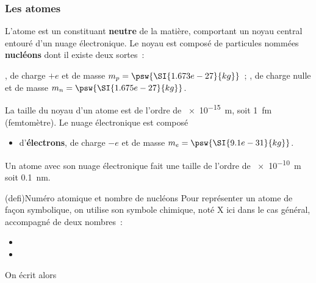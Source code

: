 \documentclass[../../main/main.tex]{subfiles}
\begin{document}
\subsubsection{Les atomes}
L'atome est un constituant \textbf{neutre} de la matière, comportant un
noyau central entouré d'un nuage électronique. Le noyau est composé de
particules nommées \textbf{nucléons} dont il existe deux sortes~:
\begin{itemize}
	, de charge $+e$ et de masse $m_p =
		\psw{\SI{1.673e-27}{kg}}$~;
	, de charge nulle et de masse $m_n =
		\psw{\SI{1.675e-27}{kg}}$.
\end{itemize}
La taille du noyau d'un atome est de l'ordre de \SI{e-15}{m}, soit
\SI{1}{fm} (femtomètre).
\smallbreak
Le nuage électronique est composé
\begin{itemize}
	\item d'\textbf{électrons}, de charge $-e$ et de masse $m_e =
		      \psw{\SI{9.1e-31}{kg}}$.
\end{itemize}
Un atome avec son nuage électronique fait une taille de l'ordre de
\SI{e-10}{m} soit \SI{0.1}{nm}.

\begin{tcb}[label=def:numéroatomique,
		sidebyside, righthand ratio=.2](defi){Numéro atomique et nombre de nucléons}
	Pour représenter un atome de façon symbolique, on utilise son symbole
	chimique, noté X ici dans le cas général, accompagné de deux nombres~:
	\begin{itemize}
		\item {}
		\item {}
	\end{itemize}
	\tcblower
	On écrit alors
	\psw{
		\[
			\ce{^{A}_{Z}X}
		\]
	}
\end{tcb}
\end{document}
